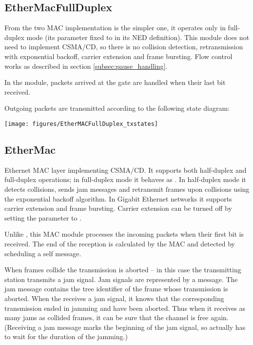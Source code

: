 \subsection{EtherMacFullDuplex}

From the two MAC implementation  is the simpler one,
it operates only in full-duplex mode (its  parameter fixed to
 in its NED definition). This module does not need to implement
CSMA/CD, so there is no collision detection, retransmission with exponential backoff,
carrier extension and frame bursting. Flow control works as described in section
\ref{subsec:pause_handling}.


In the  module,
packets arrived at the  gate are handled when their last bit received.

Outgoing packets are transmitted according to the following state diagram:

\begin{center}
\texttt{[image: figures/EtherMACFullDuplex\_txstates]}
\end{center}

\subsection{EtherMac}

Ethernet MAC layer implementing CSMA/CD. It supports both half-duplex and full-duplex operations;
in full-duplex mode it behaves as . In half-duplex  mode
it detects collisions, sends jam messages and retransmit frames upon collisions using
the exponential backoff algorithm. In Gigabit Ethernet networks it supports carrier
extension and frame bursting. Carrier extension can be turned off by setting the
 parameter to .

Unlike , this MAC module processes the incoming packets when their
first bit is received. The end of the reception is calculated by the MAC and
detected by scheduling a self message.

When frames collide the transmission is aborted -- in this case the transmitting
station transmits a jam signal. Jam signals are represented
by a  message. The jam message contains the tree identifier
of the frame whose transmission is aborted. When the  receives a jam
signal, it knows that the corresponding transmission ended in jamming and have
been aborted. Thus when it receives as many jams as collided frames, it can
be sure that the channel is free again. (Receiving a jam message marks the
beginning of the jam signal, so actually has to wait for the duration of the jamming.)

